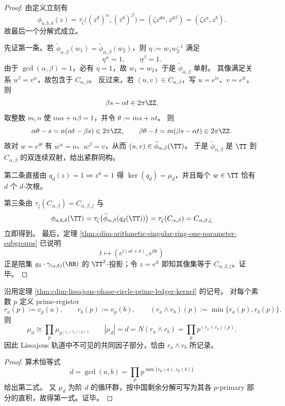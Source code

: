 \begin{proof}
由定义立刻有
\[
\phi_{a,b,\delta}(z)
=
\tau_\zeta\bigl((z^d)^\alpha,(z^d)^\beta\bigr)
=
(\zeta z^{d\alpha},z^{d\beta})
=
(\zeta z^a,z^b).
\]
故最后一个分解式成立。
\par
先证第一条。若 \(\widetilde\phi_{\alpha,\beta}(w_1)=\widetilde\phi_{\alpha,\beta}(w_2)\)，则 \(\eta:=w_1w_2^{-1}\) 满足
\[
\eta^\alpha=1,\qquad \eta^\beta=1.
\]
由于 \(\gcd(\alpha,\beta)=1\)，必有 \(\eta=1\)，故 \(w_1=w_2\)，于是 \(\widetilde\phi_{\alpha,\beta}\) 单射。
其像满足关系 \(u^\beta=v^\alpha\)，故包含于 \(C_{\alpha,\beta}\)。
反过来，若 \((u,v)\in C_{\alpha,\beta}\)，写 \(u=e^{\mathrm{i}s}\)、\(v=e^{\mathrm{i}t}\)，则
\[
\beta s-\alpha t\in 2\pi\ZZ.
\]
取整数 \(m,n\) 使 \(m\alpha+n\beta=1\)，并令 \(\theta:=ms+nt\)。
则
\[
\alpha\theta-s=n(\alpha t-\beta s)\in 2\pi\ZZ,
\qquad
\beta\theta-t=m(\beta s-\alpha t)\in 2\pi\ZZ.
\]
故对 \(w=e^{\mathrm{i}\theta}\) 有 \(w^\alpha=u\)、\(w^\beta=v\)，从而 \((u,v)\in \widetilde\phi_{\alpha,\beta}(\TT)\)。
于是 \(\widetilde\phi_{\alpha,\beta}\) 是 \(\TT\) 到 \(C_{\alpha,\beta}\) 的双连续双射，给出紧群同构。
\par
第二条直接由 \(q_d(z)=1\iff z^d=1\) 得 \(\ker(q_d)=\mu_d\)，并且每个 \(w\in\TT\) 恰有 \(d\) 个 \(d\)-次根。
\par
第三条由 \(\tau_\zeta(C_{\alpha,\beta})=C_{\alpha,\beta,\zeta}\) 与
\[
\phi_{a,b,\delta}(\TT)
=
\tau_\zeta\bigl(\widetilde\phi_{\alpha,\beta}(q_d(\TT))\bigr)
=
\tau_\zeta(C_{\alpha,\beta})
=
C_{\alpha,\beta,\zeta}
\]
立即得到。
最后，定理 \ref{thm:cdim-arithmetic-singular-ring-one-parameter-subgroups} 已说明
\[
t\longmapsto (e^{\mathrm{i}(at+\delta)},e^{\mathrm{i}bt})
\]
正是陪集 \(g_\delta\cdot\gamma_{(a,b)}(\RR)\) 的 \(\TT^2\)-投影；令 \(z=e^{\mathrm{i}t}\) 即知其像集等于 \(C_{\alpha,\beta,\zeta}\)。证毕。
\end{proof}

\begin{corollary}\label{cor:cdim-lissajous-prime-register-meet-kernel}
沿用定理 \ref{thm:cdim-lissajous-phase-circle-prime-ledger-kernel} 的记号。
对每个素数 \(p\) 定义 prime-register
\[
r_a(p):=v_p(a),\qquad r_b(p):=v_p(b),\qquad (r_a\wedge r_b)(p):=\min\{r_a(p),r_b(p)\}.
\]
则
\[
\mu_d\cong \prod_{p}\mu_{p^{(r_a\wedge r_b)(p)}},
\qquad
|\mu_d|
=
d
=
N(r_a\wedge r_b)
=
\prod_{p}p^{(r_a\wedge r_b)(p)}.
\]
因此 Lissajous 轨道中不可见的共同因子部分，恰由 \(r_a\wedge r_b\) 所记录。
\end{corollary}
\begin{proof}
算术恒等式
\[
d=\gcd(a,b)=\prod_{p}p^{\min\{v_p(a),v_p(b)\}}
\]
给出第二式。
又 \(\mu_d\) 为阶 \(d\) 的循环群，按中国剩余分解可写为其各 \(p\)-primary 部分的直积，故得第一式。证毕。
\end{proof}

